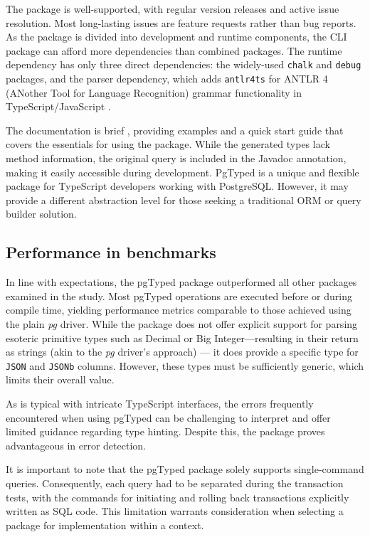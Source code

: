 The package is well-supported, with regular version releases and active issue
resolution. Most long-lasting issues are feature requests rather than bug
reports. As the package is divided into development and runtime components, the
CLI package can afford more dependencies than combined packages. The runtime
dependency has only three direct dependencies: the widely-used \texttt{chalk}
and \texttt{debug} packages, and the parser dependency, which adds
\texttt{antlr4ts} for ANTLR 4 (ANother Tool for Language Recognition) grammar
functionality in TypeScript/JavaScript \cite{pgtyped/runtime}.

The documentation is brief \cite{pgtyped-docs}, providing examples and a quick
start guide that covers the essentials for using the package. While the
generated types lack method information, the original query is included in the
Javadoc annotation, making it easily accessible during development. PgTyped is a
unique and flexible package for TypeScript developers working with PostgreSQL.
However, it may provide a different abstraction level for those seeking a
traditional ORM or query builder solution.

\subsection*{Performance in benchmarks}
In line with expectations, the pgTyped package outperformed all other packages
examined in the study. Most pgTyped operations are executed before or during
compile time, yielding performance metrics comparable to those achieved using
the plain \textit{pg} driver. While the package does not offer explicit support for
parsing esoteric primitive types such as Decimal or Big Integer—resulting in
their return as strings (akin to the \textit{pg} driver's approach) — it does provide a
specific type for \texttt{JSON} and \texttt{JSONb} columns. However, these types
must be sufficiently generic, which limits their overall value.

As is typical with intricate TypeScript interfaces, the errors frequently
encountered when using pgTyped can be challenging to interpret and offer
limited guidance regarding type hinting. Despite this, the package proves
advantageous in error detection.

It is important to note that the pgTyped package solely supports
single-command queries. Consequently, each query had to be separated during the
transaction tests, with the commands for initiating and rolling back
transactions explicitly written as SQL code. This limitation warrants
consideration when selecting a package for implementation within a context.
